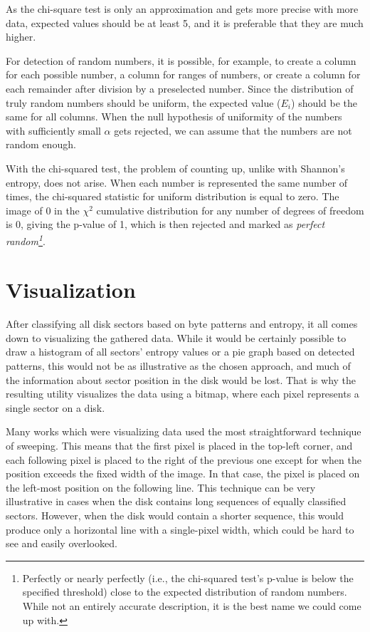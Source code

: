 \documentclass[
  digital, %
  color,   %
  oneside, %
  lof,     %
  nolot,     %
]{fithesis4}
\begin{document}
As the chi-square test is only an approximation and gets more precise with more data, expected values should be at least 5, and it is preferable that they are much higher.\cite{knuth81}

For detection of random numbers, it is possible, for example, to create a column for each possible number, a column for ranges of numbers, or create a column for each remainder after division by a preselected number.
Since the distribution of truly random numbers should be uniform, the expected value ($E_i$) should be the same for all columns.
When the null hypothesis of uniformity of the numbers with sufficiently small $\alpha$ gets rejected, we can assume that the numbers are not random enough.

With the chi-squared test, the problem of counting up, unlike with Shannon's entropy, does not arise.
When each number is represented the same number of times, the chi-squared statistic for uniform distribution is equal to zero.
The image of 0 in the $\chi^2$ cumulative distribution for any number of degrees of freedom is 0, giving the p-value of 1, which is then rejected and marked as \emph{perfect random\footnote{
  Perfectly or nearly perfectly (i.e., the chi-squared test's p-value is below the specified threshold) close to the expected distribution of random numbers.
  While not an entirely accurate description, it is the best name we could come up with.
}}.

\section{Visualization}
\label{sec:visualization}
After classifying all disk sectors based on byte patterns and entropy, it all comes down to visualizing the gathered data.
While it would be certainly possible to draw a histogram of all sectors' entropy values or a pie graph based on detected patterns, this would not be as illustrative as the chosen approach, and much of the information about sector position in the disk would be lost.
That is why the resulting utility visualizes the data using a bitmap, where each pixel represents a single sector on a disk.

Many works which were visualizing data used the most straightforward technique of sweeping.\cite{hargreaves13, charalampidis18, broz11}
This means that the first pixel is placed in the top-left corner, and each following pixel is placed to the right of the previous one except for when the position exceeds the fixed width of the image.
In that case, the pixel is placed on the left-most position on the following line.
This technique can be very illustrative in cases when the disk contains long sequences of equally classified sectors.
However, when the disk would contain a shorter sequence, this would produce only a horizontal line with a single-pixel width, which could be hard to see and easily overlooked. 
\end{document}
